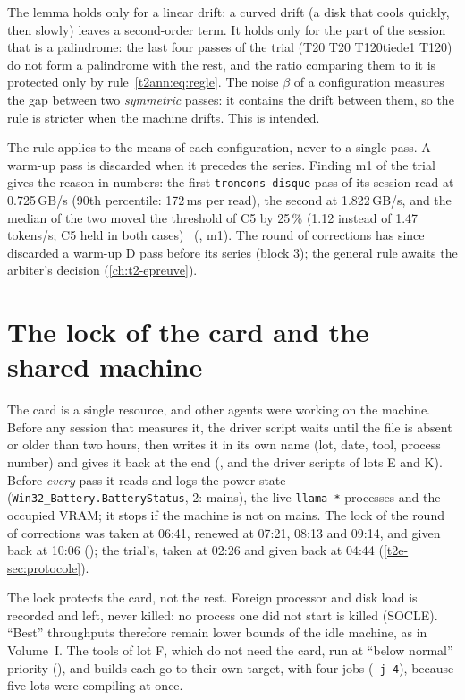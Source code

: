 \begin{remarque}
The lemma holds only for a linear drift: a curved drift (a disk that cools quickly, then slowly) leaves a second-order term. It holds only for the part of the session that is a palindrome: the last four passes of the trial (T20 T20 T120tiede1 T120) do not form a palindrome with the rest, and the ratio comparing them to it is protected only by rule~\eqref{t2ann:eq:regle}. The noise $\beta$ of a configuration measures the gap between two \emph{symmetric} passes: it contains the drift between them, so the rule is stricter when the machine drifts. This is intended.
\end{remarque}

The rule applies to the means of each configuration, never to a single pass. A warm-up pass is discarded when it precedes the series. Finding m1 of the trial gives the reason in numbers: the first \texttt{troncons disque} pass of its session read at 0.725\,GB/s (90th percentile: 172\,ms per read), the second at 1.822\,GB/s, and the median of the two moved the threshold of C5 by 25\,\% (1.12 instead of 1.47 tokens/s; C5 held in both cases) \mes~(, m1). The round of corrections has since discarded a warm-up D pass before its series (block 3); the general rule awaits the arbiter's decision (\cref{ch:t2-epreuve}).

\section{The lock of the card and the shared machine}\label{t2ann:sec:verrou}

The card is a single resource, and other agents were working on the machine. Before any session that measures it, the driver script waits until the file  is absent or older than two hours, then writes it in its own name (lot, date, tool, process number) and gives it back at the end (, and the driver scripts of lots E and K). Before \emph{every} pass it reads and logs the power state (\texttt{Win32\_Battery.BatteryStatus}, 2: mains), the live \texttt{llama-*} processes and the occupied VRAM; it stops if the machine is not on mains. The lock of the round of corrections was taken at 06:41, renewed at 07:21, 08:13 and 09:14, and given back at 10:06 (); the trial's, taken at 02:26 and given back at 04:44 (\cref{t2e-sec:protocole}).

The lock protects the card, not the rest. Foreign processor and disk load is recorded and left, never killed: no process one did not start is killed (SOCLE). \enquote{Best} throughputs therefore remain lower bounds of the idle machine, as in Volume~I. The tools of lot F, which do not need the card, run at \enquote{below normal} priority (), and builds each go to their own target, with four jobs (\texttt{-j 4}), because five lots were compiling at once.

